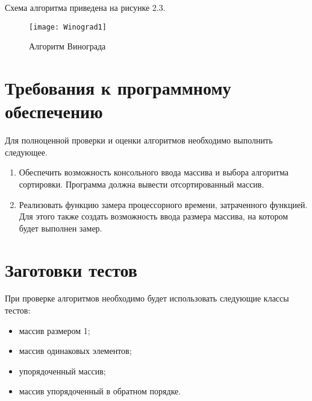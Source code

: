 Схема алгоритма приведена на рисунке 2.3.
\begin{figure}[h]
	\begin{center}
		{\texttt{[image: Winograd1]}}
		\caption{Алгоритм Винограда}
	\end{center}
\end{figure}


\section{Требования к программному обеспечению}
Для полноценной проверки и оценки алгоритмов необходимо выполнить следующее.
\begin{enumerate}
	\item Обеспечить возможность консольного ввода массива и выбора алгоритма сортировки. Программа должна вывести отсортированный массив.
	\item Реализовать функцию замера процессорного времени, затраченного функцией. Для этого также создать возможность ввода размера массива, на котором будет выполнен замер.
\end{enumerate}


\section{Заготовки тестов}
При проверке алгоритмов необходимо будет использовать следующие классы тестов:
\begin{itemize}
	\item массив размером 1;
	\item массив одинаковых элементов;
	\item упорядоченный массив;
	\item массив упорядоченный в обратном порядке.
\end{itemize}



